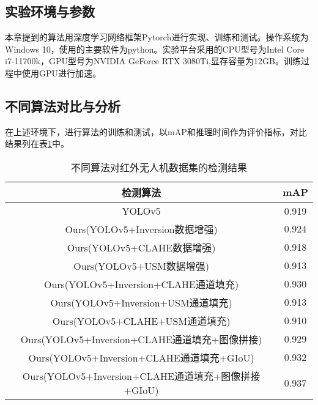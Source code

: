 \subsection{实验环境与参数}
本章提到的算法用深度学习网络框架Pytorch进行实现、训练和测试。操作系统为Windows 10，使用的主要软件为python。实验平台采用的CPU型号为Intel Core i7-11700k，GPU型号为NVIDIA GeForce RTX 3080Ti,显存容量为12GB。训练过程中使用GPU进行加速。

\subsection{不同算法对比与分析}
在上述环境下，进行算法的训练和测试，以mAP和推理时间作为评价指标，对比结果列在表\ref{m1}中。

\begin{table}[htbp]
  \caption{不同算法对红外无人机数据集的检测结果}
  \vspace{0.5em}\centering\wuhao
  \begin{tabular}{cc}
  \toprule
  检测算法 & mAP\\
  \midrule
  YOLOv5 & 0.919\\
  Ours(YOLOv5+Inversion数据增强) & 0.924\\
  Ours(YOLOv5+CLAHE数据增强) & 0.918\\
  Ours(YOLOv5+USM数据增强) & 0.913\\
  Ours(YOLOv5+Inversion+CLAHE通道填充) & 0.930\\
  Ours(YOLOv5+Inversion+USM通道填充) & 0.913\\
  Ours(YOLOv5+CLAHE+USM通道填充) & 0.910\\
  Ours(YOLOv5+Inversion+CLAHE通道填充+图像拼接) & 0.929\\
  Ours(YOLOv5+Inversion+CLAHE通道填充+GIoU) & 0.932\\
  Ours(YOLOv5+Inversion+CLAHE通道填充+图像拼接+GIoU) & 0.937\\
  \bottomrule
  \end{tabular}
  \label{m1}
\end{table}

